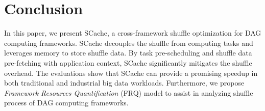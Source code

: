 \section{Conclusion}\label{conclusion}
In this paper, we present SCache, a cross-framework shuffle optimization for DAG computing frameworks. 
SCache decouples the shuffle from computing tasks and leverages memory to store shuffle data. 
By task pre-scheduling and shuffle data pre-fetching with application context, SCache significantly mitigates the shuffle overhead. 
{\color{black}
The evaluations show that SCache can provide a promising speedup in both traditional and industrial big data workloads. 
Furthermore, we propose \textit{Framework Resources Quantification} (FRQ) model to assist in analyzing shuffle process of DAG computing frameworks. 
}
